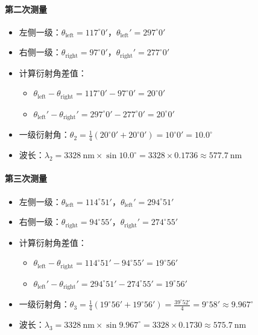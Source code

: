 \documentclass[11pt]{article}
\begin{document}
\paragraph{第二次测量}

\begin{itemize}[itemsep=0.3ex]
\item 左侧一级：\(\theta_{\text{left}} = 117^\circ0'\)，\(\theta_{\text{left}}' = 297^\circ0'\)
\item 右侧一级：\(\theta_{\text{right}} = 97^\circ0'\)，\(\theta_{\text{right}}' = 277^\circ0'\)
\item 计算衍射角差值：
  \begin{itemize}
  \item \(\theta_{\text{left}} - \theta_{\text{right}} = 117^\circ0' - 97^\circ0' = 20^\circ0'\)
  \item \(\theta_{\text{left}}' - \theta_{\text{right}}' = 297^\circ0' - 277^\circ0' = 20^\circ0'\)
  \end{itemize}
\item 一级衍射角：\(\theta_2 = \frac{1}{4}(20^\circ0' + 20^\circ0') = 10^\circ0' = 10.0^\circ\)
\item 波长：\(\lambda_2 = 3328\ \text{nm} \times \sin 10.0^\circ = 3328 \times 0.1736 \approx 577.7\ \text{nm}\)
\end{itemize}

\paragraph{第三次测量}

\begin{itemize}[itemsep=0.3ex]
\item 左侧一级：\(\theta_{\text{left}} = 114^\circ51'\)，\(\theta_{\text{left}}' = 294^\circ51'\)
\item 右侧一级：\(\theta_{\text{right}} = 94^\circ55'\)，\(\theta_{\text{right}}' = 274^\circ55'\)
\item 计算衍射角差值：
  \begin{itemize}
  \item \(\theta_{\text{left}} - \theta_{\text{right}} = 114^\circ51' - 94^\circ55' = 19^\circ56'\)
  \item \(\theta_{\text{left}}' - \theta_{\text{right}}' = 294^\circ51' - 274^\circ55' = 19^\circ56'\)
  \end{itemize}
\item 一级衍射角：\(\theta_3 = \frac{1}{4}(19^\circ56' + 19^\circ56') = \frac{39^\circ52'}{4} = 9^\circ58' \approx 9.967^\circ\)
\item 波长：\(\lambda_3 = 3328\ \text{nm} \times \sin 9.967^\circ = 3328 \times 0.1730 \approx 575.7\ \text{nm}\)
\end{itemize}
\end{document}
